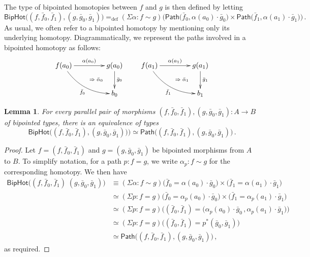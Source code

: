 \documentclass[10pt,a4paper,oneside,reqno]{amsart}
\numberwithin{equation}{section}
\theoremstyle{mythm}
\newtheorem{lemma}[theorem]{Lemma}
\theoremstyle{mydef}
\theoremstyle{myrmk}
\newcommand{\deq}{\equiv}
\newcommand{\defeq}{=_{\mathrm{def}}}
\newcommand{\co}{\colon}
\newcommand{\ct}{\cdot}
\newcommand{\Id}{\mathsf{Path}}
\newcommand{\BipHot}{\mathsf{BipHot}}
\begin{document}
The type of bipointed homotopies between $f$ and $g$ is then defined by letting
\[
 \BipHot  \big( (f,\bar{f}_0, \bar{f}_1), (g, \bar{g}_0, \bar{g}_1) \big)   \defeq   
 (\Sigma \alpha \co f \sim g)  \big( 
  \Id\big( \bar{f}_0 ,  \alpha(a_0)  \ct \bar{g}_0 \big) \times 
  \Id \big( \bar{f}_1,  \alpha(a_1) \ct  \bar{g}_1 \big) \big) \, .
\]
As usual, we often refer to a bipointed homotopy by mentioning only its underlying homotopy.
Diagrammatically, we represent the paths involved in a bipointed homotopy as follows:
\[
\xymatrix@C=1.5cm{
f(a_0) \ar[r]^{\alpha(a_0)}  \ar@/_1pc/[dr]_{\bar{f}_0}  
\ar@{}[dr]|{\qquad \Rightarrow \; \bar{\alpha}_0}  & g(a_0) \ar[d]^{\bar{g}_0}  \\ 
 & b_0 } \qquad
 \xymatrix@C=1.5cm{
f(a_1) \ar[r]^{\alpha(a_1)}  \ar@/_1pc/[dr]_{\bar{f}_1}  
\ar@{}[dr]|{\qquad \Rightarrow \; \bar{\alpha}_1}  & g(a_1) \ar[d]^{\bar{g}_1}  \\ 
 & b_1 }
 \] 



\begin{lemma} \label{BoolHomSpace} 
For every parallel pair of morphisms $(f, \bar{f}_0, \bar{f}_1), (g, \bar{g}_0, \bar{g}_1) \co A \to B$ of bipointed types, there is an equivalence of types
\[
\BipHot\big( (f, \bar{f}_0, \bar{f}_1), (g, \bar{g}_0, \bar{g}_1) ) \big) \simeq 
\Id \big( (f, \bar{f}_0, \bar{f}_1), (g, \bar{g}_0, \bar{g}_1) \big)\, .
\]
\end{lemma}

\begin{proof} Let  $f = (f, \bar{f}_0, \bar{f}_1)$ and $g = (g, \bar{g}_0, \bar{g}_1)$ be bipointed
morphisms from $A$ to $B$. To simplify notation, for a path $p \co f = g$, we write $\alpha_p \co f \sim g$
for the corresponding homotopy. We then have
\begin{align*}
\BipHot \big( (f,\bar{f}_0,\bar{f}_1) \; (g,\bar{g}_0,\bar{g}_1) \big) & \deq  
(\Sigma \alpha : f \sim g) \big(\bar{f}_0 = \alpha(a_0) \ct \bar{g}_0\big) \times \big(\bar{f}_1 = \alpha(a_1) \ct \bar{g}_1 \big) \\ 
& \simeq  (\Sigma p : f = g) \big(\bar{f}_0 = \alpha_p(a_0) \ct \bar{g}_0\big) \times \big( \bar{f}_1 = \alpha_p(a_1) \ct \bar{g}_1 \big) \\
& \simeq (\Sigma p : f = g) \big((\bar{f}_0,\bar{f}_1) = \big(\alpha_p(a_0) \ct \bar{g}_0 \, ,  \alpha_p(a_1) \ct \bar{g}_1\big) \big) \\
& \simeq (\Sigma p : f = g) \big((\bar{f}_0,\bar{f}_1) = p^{\ast} (\bar{g}_0,\bar{g}_1) \big) \\
& \simeq  \Id \big( (f,\bar{f}_0,\bar{f}_1) , (g,\bar{g}_0,\bar{g}_1)  \big) \, ,
\end{align*} 
as required.
\end{proof}
\end{document}
